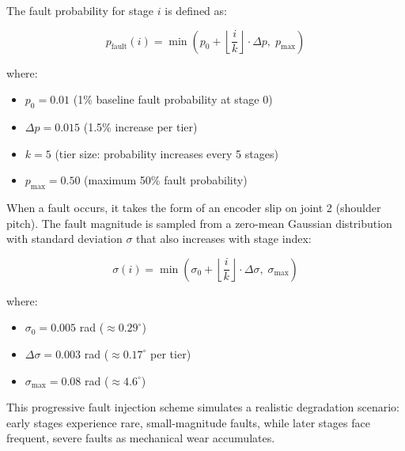 \documentclass[12pt,a4paper,oneside]{report}
\begin{document}
The fault probability for stage $i$ is defined as:

\begin{equation}
p_{\text{fault}}(i) = \min\left(p_0 + \left\lfloor \frac{i}{k} \right\rfloor \cdot \Delta p,\; p_{\text{max}}\right)
\end{equation}

where:
\begin{itemize}
    \item $p_0 = 0.01$ (1\% baseline fault probability at stage 0)
    \item $\Delta p = 0.015$ (1.5\% increase per tier)
    \item $k = 5$ (tier size: probability increases every 5 stages)
    \item $p_{\text{max}} = 0.50$ (maximum 50\% fault probability)
\end{itemize}

When a fault occurs, it takes the form of an encoder slip on joint 2 (shoulder pitch). The fault magnitude is sampled from a zero-mean Gaussian distribution with standard deviation $\sigma$ that also increases with stage index:

\begin{equation}
\sigma(i) = \min\left(\sigma_0 + \left\lfloor \frac{i}{k} \right\rfloor \cdot \Delta \sigma,\; \sigma_{\text{max}}\right)
\end{equation}

where:
\begin{itemize}
    \item $\sigma_0 = 0.005$ rad ($\approx 0.29^\circ$)
    \item $\Delta \sigma = 0.003$ rad ($\approx 0.17^\circ$ per tier)
    \item $\sigma_{\text{max}} = 0.08$ rad ($\approx 4.6^\circ$)
\end{itemize}

This progressive fault injection scheme simulates a realistic degradation scenario: early stages experience rare, small-magnitude faults, while later stages face frequent, severe faults as mechanical wear accumulates.
\end{document}
